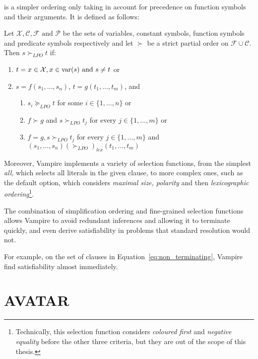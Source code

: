  is a simpler ordering only taking in account for precedence on function symbols and their arguments.
It is defined as follows:
\begin{definition}
  Let \(\mathcal{X},\mathcal{C},\mathcal{F} \text{ and } \mathcal{P}\) be the sets of variables, constant symbols, function symbols and predicate symbols respectively and let \(\succ\) be a strict partial order on \(\mathcal{F} \cup \mathcal{C}\).
  Then \(s\succ_{LPO} t\) if:
  \begin{enumerate}
    \item \(t = x \in \mathcal{X}, x \in \text{var} (s) \text{ and } s \neq t\) or
    \item \(s = f(s_1,\ldots,s_n)\), \(t = g(t_1,\ldots,t_m)\), and
          \begin{enumerate}
            \item \(s_i \succeq_{LPO} t\) for some \(i \in \{1,\ldots,n\}\) or
            \item \(f \succ g\) and \(s \succ_{LPO} t_j\) for every \(j \in \{1,\ldots,m\}\) or
            \item \(f = g, s \succ_{LPO} t_j\) for every \(j \in \{1,\ldots,m\}\) and \((s_1, \ldots, s_n) {(\succ_{LPO})}_{lex} (t_1, \ldots, t_m)\)
          \end{enumerate}
  \end{enumerate}
\end{definition}

Moreover, Vampire implements a variety of selection functions, from the simplest \emph{all}, which selects all literals in the given clause, to more complex ones, such as the default option, which considers \emph{maximal size, polarity} and then \emph{lexicographic ordering}\footnote{
  Technically, this selection function considers \emph{coloured first} and \emph{negative equality} before the other three criteria, but they are out of the scope of this thesis.
}.

The combination of simplification ordering and fine-grained selection functions allows Vampire to avoid redundant inferences and allowing it to terminate quickly, and even derive satisfiability in problems that standard resolution would not.

For example, on the set of clauses in Equation~\ref{eq:non_terminating}, Vampire find satisfiability almost immediately.

\section{AVATAR}\label{sec:avatar-architecture}

